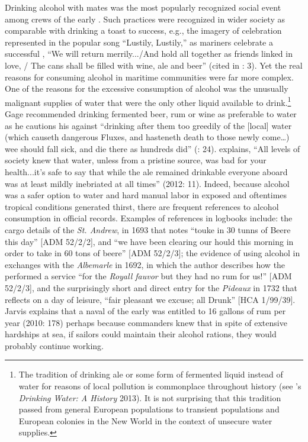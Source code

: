 Drinking alcohol with  mates was the most popularly recognized social event among crews of the early . Such practices were recognized in wider society as comparable with drinking a toast to success, e.g., the imagery of celebration represented in the popular song “Lustily, Lustily,” as mariners celebrate a successful , “We will return merrily.../And hold all together as friends linked in love, / The cans shall be filled with wine, ale and beer” (cited in \citealt{Palmer1986}: 3). Yet the real reasons for consuming alcohol in maritime communities were far more complex. One of the reasons for the excessive consumption of alcohol was the unusually malignant supplies of water that were the only other liquid available to drink.\footnote{The tradition of drinking ale or some form of fermented liquid instead of water for reasons of local pollution is commonplace throughout history (see \citeauthor{Salzman2013}’s \textit{Drinking Water: A History} 2013). It is not surprising that this tradition passed from general European populations to transient populations and European colonies in the New World in the context of unsecure water supplies.}  Gage recommended drinking fermented beer, rum or wine as preferable to water as he cautions his  against “drinking after them too greedily of the [local] water (which causeth dangerous Fluxes, and hasteneth death to those newly come…) wee should fall sick, and die there as hundreds did” (\citealt{Gage1648}: 24). \citeauthor{Bicheno2012} explains, “All levels of society knew that water, unless from a pristine source, was bad for your health...it’s safe to say that while the ale remained drinkable everyone aboard was at least mildly inebriated at all times” (2012: 11). Indeed, because alcohol was a safer option to water and hard manual labor in exposed and oftentimes tropical conditions generated thirst, there are frequent references to alcohol consumption in official records. Examples of references in logbooks include: the cargo details of the \textit{St. Andrew}, in 1693 that notes “touke in 30 tunns of Beere this day” [ADM 52/2/2], and “we have been clearing our hould this morning in order to take in 60 tons of beere” [ADM 52/2/3]; the evidence of using alcohol in  exchanges with the \textit{Albemarle} in 1692, in which the author describes how the  performed a service “for the \textit{Royall fauvor} but they had no rum for us!” [ADM 52/2/3], and the surprisingly short and direct entry for the \textit{Pideaux} in 1732 that reflects on a day of leisure, “fair pleasant we excuse; all Drunk” [HCA 1/99/39]. Jarvis explains that a naval  of the early  was entitled to 16 gallons of rum per year (2010: 178) perhaps because commanders knew that in spite of extensive hardships at sea, if sailors could maintain their alcohol rations, they would probably continue working. 


